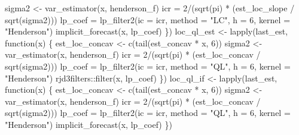 \documentclass[
]{article}
\newenvironment{Shaded}{\begin{snugshade}}{\end{snugshade}}
\newcommand{\AttributeTok}[1]{\textcolor[rgb]{0.40,0.45,0.13}{#1}}
\newcommand{\ControlFlowTok}[1]{\textcolor[rgb]{0.00,0.23,0.31}{#1}}
\newcommand{\DecValTok}[1]{\textcolor[rgb]{0.68,0.00,0.00}{#1}}
\newcommand{\FunctionTok}[1]{\textcolor[rgb]{0.28,0.35,0.67}{#1}}
\newcommand{\NormalTok}[1]{\textcolor[rgb]{0.00,0.23,0.31}{#1}}
\newcommand{\OtherTok}[1]{\textcolor[rgb]{0.00,0.23,0.31}{#1}}
\newcommand{\SpecialCharTok}[1]{\textcolor[rgb]{0.37,0.37,0.37}{#1}}
\newcommand{\StringTok}[1]{\textcolor[rgb]{0.13,0.47,0.30}{#1}}
\newcommand\1{\mathds{1}}
\begin{document}
\begin{Shaded}
\begin{Highlighting}[]
\NormalTok{    sigma2 }\OtherTok{\textless{}{-}} \FunctionTok{var\_estimator}\NormalTok{(x, henderson\_f)}
\NormalTok{    icr }\OtherTok{=} \DecValTok{2}\SpecialCharTok{/}\NormalTok{(}\FunctionTok{sqrt}\NormalTok{(pi) }\SpecialCharTok{*}\NormalTok{ (est\_loc\_slope }\SpecialCharTok{/} \FunctionTok{sqrt}\NormalTok{(sigma2)))}
\NormalTok{    lp\_coef }\OtherTok{=} \FunctionTok{lp\_filter2}\NormalTok{(}\AttributeTok{ic =}\NormalTok{ icr,}
                         \AttributeTok{method =} \StringTok{"LC"}\NormalTok{, }\AttributeTok{h =} \DecValTok{6}\NormalTok{, }\AttributeTok{kernel =} \StringTok{"Henderson"}\NormalTok{)}
    \FunctionTok{implicit\_forecast}\NormalTok{(x, lp\_coef)}
\NormalTok{  \})}
\NormalTok{loc\_ql\_est }\OtherTok{\textless{}{-}}
  \FunctionTok{lapply}\NormalTok{(last\_est, }\ControlFlowTok{function}\NormalTok{(x) \{}
\NormalTok{    est\_loc\_concav }\OtherTok{\textless{}{-}} \FunctionTok{c}\NormalTok{(}\FunctionTok{tail}\NormalTok{(est\_concav }\SpecialCharTok{*}\NormalTok{ x, }\DecValTok{6}\NormalTok{))}
\NormalTok{    sigma2 }\OtherTok{\textless{}{-}} \FunctionTok{var\_estimator}\NormalTok{(x, henderson\_f)}
\NormalTok{    icr }\OtherTok{=} \DecValTok{2}\SpecialCharTok{/}\NormalTok{(}\FunctionTok{sqrt}\NormalTok{(pi) }\SpecialCharTok{*}\NormalTok{ (est\_loc\_concav }\SpecialCharTok{/} \FunctionTok{sqrt}\NormalTok{(sigma2)))}
\NormalTok{    lp\_coef }\OtherTok{=} \FunctionTok{lp\_filter2}\NormalTok{(}\AttributeTok{ic =}\NormalTok{ icr,}
                         \AttributeTok{method =} \StringTok{"QL"}\NormalTok{, }\AttributeTok{h =} \DecValTok{6}\NormalTok{, }\AttributeTok{kernel =} \StringTok{"Henderson"}\NormalTok{)}
\NormalTok{    rjd3filters}\SpecialCharTok{::}\FunctionTok{filter}\NormalTok{(x, lp\_coef)}
\NormalTok{  \})}
\NormalTok{loc\_ql\_if }\OtherTok{\textless{}{-}}
  \FunctionTok{lapply}\NormalTok{(last\_est, }\ControlFlowTok{function}\NormalTok{(x) \{}
\NormalTok{    est\_loc\_concav }\OtherTok{\textless{}{-}} \FunctionTok{c}\NormalTok{(}\FunctionTok{tail}\NormalTok{(est\_concav }\SpecialCharTok{*}\NormalTok{ x, }\DecValTok{6}\NormalTok{))}
\NormalTok{    sigma2 }\OtherTok{\textless{}{-}} \FunctionTok{var\_estimator}\NormalTok{(x, henderson\_f)}
\NormalTok{    icr }\OtherTok{=} \DecValTok{2}\SpecialCharTok{/}\NormalTok{(}\FunctionTok{sqrt}\NormalTok{(pi) }\SpecialCharTok{*}\NormalTok{ (est\_loc\_concav }\SpecialCharTok{/} \FunctionTok{sqrt}\NormalTok{(sigma2)))}
\NormalTok{    lp\_coef }\OtherTok{=} \FunctionTok{lp\_filter2}\NormalTok{(}\AttributeTok{ic =}\NormalTok{ icr,}
                         \AttributeTok{method =} \StringTok{"QL"}\NormalTok{, }\AttributeTok{h =} \DecValTok{6}\NormalTok{, }\AttributeTok{kernel =} \StringTok{"Henderson"}\NormalTok{)}
    \FunctionTok{implicit\_forecast}\NormalTok{(x, lp\_coef)}
\NormalTok{  \})}


\end{Highlighting}
\end{Shaded}
\end{document}
